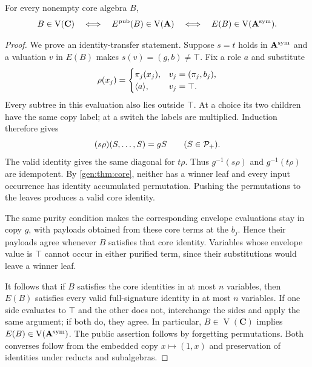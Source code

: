 \begin{lemma}\label{full:lem:envelope}
For every nonempty core algebra $B$,
\[
 B\in\operatorname V(\mathbf C)
 \quad\Longleftrightarrow\quad
 E^{\rm pub}(B)\in\operatorname V(\mathbf A)
 \quad\Longleftrightarrow\quad
 E(B)\in\operatorname V(\mathbf A^{\rm sym}).
\]
\end{lemma}
\begin{proof}
We prove an identity-transfer statement. Suppose $s=t$ holds in
$\mathbf A^{\rm sym}$ and a valuation $v$ in $E(B)$ makes
$s(v)=(g,b)\ne\top$. Fix a role $a$ and substitute
\[
 \rho(x_j)=\begin{cases}
   \pi_j(x_j),&v_j=(\pi_j,b_j),\\
   \langle a\rangle,&v_j=\top.
 \end{cases}
\]
Every subtree in this evaluation also lies outside $\top$. At a choice
its two children have the same copy label; at a switch the labels are
multiplied. Induction therefore gives
\[
 (s\rho)(S,\ldots,S)=gS
 \qquad(S\in\mathcal P_+).
\]
The valid identity gives the same diagonal for $t\rho$. Thus
$g^{-1}(s\rho)$ and $g^{-1}(t\rho)$ are idempotent. By
\cref{gen:thm:core}, neither has a winner leaf and every input
occurrence has identity accumulated permutation. Pushing the
permutations to the leaves produces a valid core identity.

The same purity condition makes the corresponding envelope
evaluations stay in copy $g$, with payloads obtained from these core
terms at the $b_j$. Hence their payloads agree whenever $B$ satisfies
that core identity. Variables whose envelope value is $\top$ cannot
occur in either purified term, since their substitutions would leave a
winner leaf.

It follows that if $B$ satisfies the core identities in at most $n$
variables, then $E(B)$ satisfies every valid full-signature identity in
at most $n$ variables. If one side evaluates to $\top$ and the other does
not, interchange the sides and apply the same argument; if both do,
they agree. In particular, $B\in\operatorname V(\mathbf C)$ implies
$E(B)\in\operatorname V(\mathbf A^{\rm sym})$. The public assertion
follows by forgetting permutations. Both converses follow from the
embedded copy $x\mapsto(1,x)$ and preservation of identities under
reducts and subalgebras.
\end{proof}

